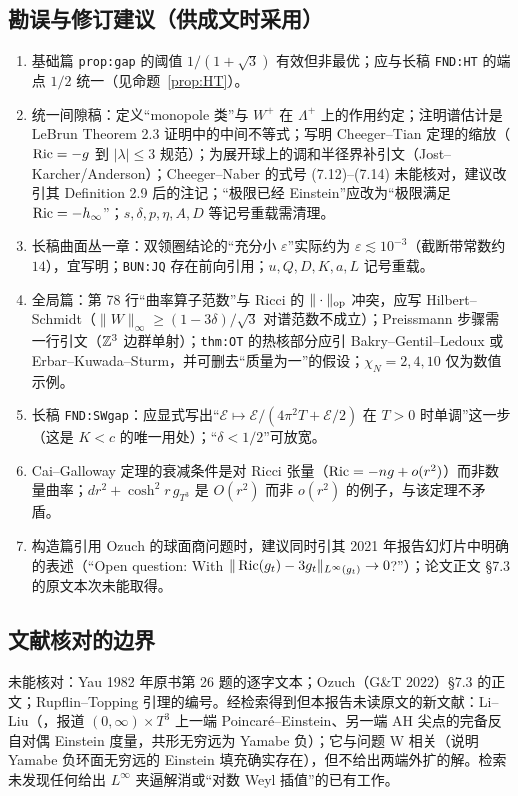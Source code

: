 \subsection{勘误与修订建议（供成文时采用）}
\begin{enumerate}
\item 基础篇 \texttt{prop:gap} 的阈值 $1/(1+\sqrt3)$ 有效但非最优；应与长稿 \texttt{FND:HT} 的端点 $1/2$ 统一（见命题~\ref{prop:HT}）。
\item 统一间隙稿：定义“monopole 类”与 $W^+$ 在 $\Lambda^+$ 上的作用约定；注明谱估计是 LeBrun Theorem 2.3 证明中的中间不等式；写明 Cheeger--Tian 定理的缩放（$\operatorname{Ric}=-g$ 到 $|\lambda|\le3$ 规范）；为展开球上的调和半径界补引文（Jost--Karcher/Anderson）；Cheeger--Naber 的式号 (7.12)--(7.14) 未能核对，建议改引其 Definition 2.9 后的注记；“极限已经 Einstein”应改为“极限满足 $\operatorname{Ric}=-h_\infty$”；$s,\delta,p,\eta,A,D$ 等记号重载需清理。
\item 长稿曲面丛一章：双领圈结论的“充分小 $\varepsilon$”实际约为 $\varepsilon\lesssim10^{-3}$（截断带常数约 $14$），宜写明；\texttt{BUN:JQ} 存在前向引用；$u,Q,D,K,a,L$ 记号重载。
\item 全局篇：第 78 行“曲率算子范数”与 Ricci 的 $\|\cdot\|_{\mathrm{op}}$ 冲突，应写 Hilbert--Schmidt（$\|W\|_\infty\ge(1-3\delta)/\sqrt3$ 对谱范数不成立）；Preissmann 步骤需一行引文（$\mathbb Z^3$ 边群单射）；\texttt{thm:OT} 的热核部分应引 Bakry--Gentil--Ledoux 或 Erbar--Kuwada--Sturm，并可删去“质量为一”的假设；$\chi_N=2,4,10$ 仅为数值示例。
\item 长稿 \texttt{FND:SWgap}：应显式写出“$\mathcal E\mapsto\mathcal E/(4\pi^2T+\mathcal E/2)$ 在 $T>0$ 时单调”这一步（这是 $K<c$ 的唯一用处）；“$\delta<1/2$”可放宽。
\item Cai--Galloway 定理的衰减条件是对 Ricci 张量（$\operatorname{Ric}=-ng+o(r^2)$）而非数量曲率；$dr^2+\cosh^2r\,g_{T^3}$ 是 $O(r^2)$ 而非 $o(r^2)$ 的例子，与该定理不矛盾。
\item 构造篇引用 Ozuch 的球面商问题时，建议同时引其 2021 年报告幻灯片中明确的表述（“Open question: With $\|\operatorname{Ric}(g_t)-3g_t\|_{L^\infty(g_t)}\to0$?”）；论文正文 \S7.3 的原文本次未能取得。
\end{enumerate}

\subsection{文献核对的边界}
未能核对：Yau 1982 年原书第 26 题的逐字文本；Ozuch（G\&T 2022）\S7.3 的正文；Rupflin--Topping 引理的编号。经检索得到但本报告未读原文的新文献：Li--Liu（\cite{LiLiu}，报道 $(0,\infty)\times T^3$ 上一端 Poincaré--Einstein、另一端 AH 尖点的完备反自对偶 Einstein 度量，共形无穷远为 Yamabe 负）；它与问题 W 相关（说明 Yamabe 负环面无穷远的 Einstein 填充确实存在），但不给出两端外扩的解。检索未发现任何给出 $L^\infty$ 夹逼解消或“对数 Weyl 插值”的已有工作。

